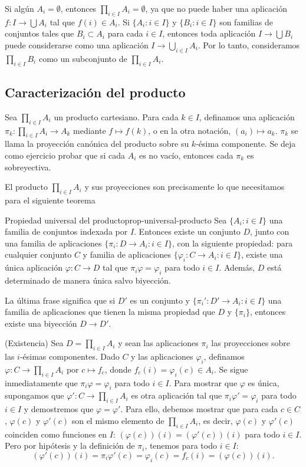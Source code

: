 Si algún $A_i = \emptyset$, entonces $\prod_{i \in I} A_i = \emptyset$, ya que no puede haber una aplicación $f: I \to \bigcup A_i$ tal que $f(i) \in A_i$. Si $\{A_i : i \in I\}$ y $\{B_i : i \in I\}$ son familias de conjuntos tales que $B_i \subset A_i$ para cada $i \in I$, entonces toda aplicación $I \to \bigcup B_i$ puede considerarse como una aplicación $I \to \bigcup_{i \in I} A_i$. Por lo tanto, consideramos $\prod_{i \in I} B_i$ como un subconjunto de $\prod_{i \in I} A_i$.

\subsection{Caracterización del producto}

Sea $\prod_{i \in I} A_i$ un producto cartesiano. Para cada $k \in I$, definamos una aplicación $\pi_k: \prod_{i \in I} A_i \to A_k$ mediante $f \mapsto f(k)$, o en la otra notación, $(a_i) \mapsto a_k$. $\pi_k$ se llama la {proyección canónica} del producto sobre su $k$-ésima componente. Se deja como ejercicio probar que si cada $A_i$ es no vacío, entonces cada $\pi_k$ es sobreyectiva.

El producto $\prod_{i \in I} A_i$ y sus proyecciones son precisamente lo que necesitamos para el siguiente teorema

\begin{theorem}{Propiedad universal del producto}{prop-universal-producto}
    Sea $\{A_i : i \in I\}$ una familia de conjuntos indexada por $I$. Entonces existe un conjunto $D$, junto con una familia de aplicaciones $\{\pi_i: D \to A_i : i \in I\}$, con la siguiente propiedad: para cualquier conjunto $C$ y familia de aplicaciones $\{\varphi_i: C \to A_i : i \in I\}$, existe una única aplicación $\varphi: C \to D$ tal que $\pi_i \varphi = \varphi_i$ para todo $i \in I$. Además, $D$ está determinado de manera única salvo biyección.
\end{theorem}

La última frase significa que si $D'$ es un conjunto y $\{\pi_i': D' \to A_i : i \in I\}$ una familia de aplicaciones que tienen la misma propiedad que $D$ y $\{\pi_i\}$, entonces existe una biyección $D \to D'$.

(Existencia) Sea $D = \prod_{i \in I} A_i$ y sean las aplicaciones $\pi_i$ las proyecciones sobre las $i$-ésimas componentes. Dado $C$ y las aplicaciones $\varphi_i$, definamos $\varphi: C \to \prod_{i \in I} A_i$ por $c \mapsto f_c$, donde $f_c(i) = \varphi_i(c) \in A_i$. Se sigue inmediatamente que $\pi_i \varphi = \varphi_i$ para todo $i \in I$. Para mostrar que $\varphi$ es única, supongamos que $\varphi': C \to \prod_{i \in I} A_i$ es otra aplicación tal que $\pi_i \varphi' = \varphi_i$ para todo $i \in I$ y demostremos que $\varphi = \varphi'$. Para ello, debemos mostrar que para cada $c \in C$, $\varphi(c)$ y $\varphi'(c)$ son el mismo elemento de $\prod_{i \in I} A_i$, es decir, $\varphi(c)$ y $\varphi'(c)$ coinciden como funciones en $I$: $(\varphi(c))(i) = (\varphi'(c))(i)$ para todo $i \in I$. Pero por hipótesis y la definición de $\pi_i$, tenemos para todo $i \in I$:
\[
(\varphi'(c))(i) = \pi_i \varphi'(c) = \varphi_i(c) = f_c(i) = (\varphi(c))(i).
\]

